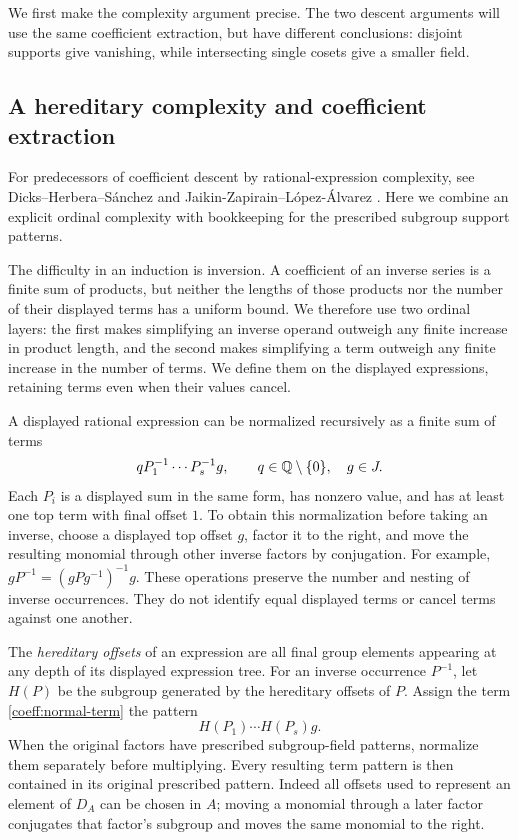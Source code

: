 We first make the complexity argument precise. The two descent
arguments will use the same coefficient extraction, but have different
conclusions: disjoint supports give vanishing, while intersecting
single cosets give a smaller field.

\subsection{A hereditary complexity and coefficient extraction}

For predecessors of coefficient descent by rational-expression complexity,
see Dicks--Herbera--S\'anchez
\cite[Sections~3--6, especially Theorem~6.3]{DicksHerberaSanchez2004}
and Jaikin-Zapirain--L\'opez-\'Alvarez
\cite[Proposition~5.1]{JaikinLopezAlvarez2020}.
Here we combine an explicit ordinal complexity with bookkeeping for the
prescribed subgroup support patterns.

The difficulty in an induction is inversion. A coefficient of an
inverse series is a finite sum of products, but neither the lengths
of those products nor the number of their displayed terms has a
uniform bound. We therefore use two ordinal layers: the first makes
simplifying an inverse operand outweigh any finite increase in
product length, and the second makes simplifying a term outweigh
any finite increase in the number of terms. We define them on the
displayed expressions, retaining terms even when their values cancel.

A displayed rational expression can be normalized recursively as a
finite sum of terms
\begin{equation}\label{coeff:normal-term}
 q P_1^{-1}\cdots P_s^{-1}g,
 \qquad q\in\mathbb Q\setminus\{0\},\quad g\in J.
\end{equation}
Each \(P_i\) is a displayed sum in the same form, has nonzero value,
and has at least one top term with final offset \(1\). To obtain this
normalization before taking an inverse, choose a displayed top offset
\(g\), factor it to the right, and move the resulting monomial through
other inverse factors by conjugation. For example,
\(gP^{-1}=(gPg^{-1})^{-1}g\). These operations preserve the number and
nesting of inverse occurrences. They do not identify equal displayed
terms or cancel terms against one another.

The \emph{hereditary offsets} of an expression are all final group
elements appearing at any depth of its displayed expression tree.
For an inverse occurrence \(P^{-1}\), let \(H(P)\) be the subgroup
generated by the hereditary offsets of \(P\). Assign the term
\eqref{coeff:normal-term} the pattern
\begin{equation}\label{coeff:displayed-pattern}
 H(P_1)\cdots H(P_s)g.
\end{equation}
When the original factors have prescribed subgroup-field patterns,
normalize them separately before multiplying. Every resulting term
pattern is then contained in its original prescribed pattern.
Indeed all offsets used to represent an element of \(D_A\) can be
chosen in \(A\); moving a monomial through a later factor conjugates
that factor's subgroup and moves the same monomial to the right.

